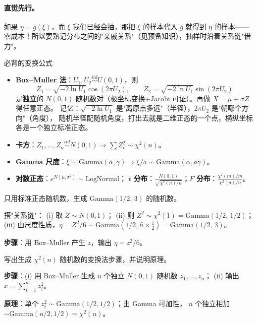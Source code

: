 \paragraph{直觉先行。}
如果 $\eta=g(\xi)$，而 $\xi$ 我们已经会抽，那把 $\xi$ 的样本代入 $g$ 就得到 $\eta$
的样本——零成本！所以要熟记分布之间的"亲戚关系"（见预备知识），抽样时沿着关系链"借力"。

\begin{kbox}{必背的变换公式}
\begin{itemize}[leftmargin=2em]
  \item \textbf{Box--Muller 法}：$U_1,U_2\overset{iid}{\sim}U(0,1)$，则
  \[
  Z_1=\sqrt{-2\ln U_1}\cos(2\pi U_2),\qquad Z_2=\sqrt{-2\ln U_1}\sin(2\pi U_2)
  \]
  是\textbf{独立}的 $N(0,1)$ 随机数对（极坐标变换+Jacobi 可证）。再做 $X=\mu+\sigma Z$ 得任意正态。
  记忆：$\sqrt{-2\ln U_1}$ 是"离原点多远"（半径），$2\pi U_2$ 是"朝哪个方向"（角度），
  随机半径配随机角度，打出去就是二维正态的一个点，横纵坐标各是一个独立标准正态。
  \item \textbf{卡方}：$Z_1,\dots,Z_n\overset{iid}{\sim}N(0,1)\Rightarrow\sum Z_i^2\sim\chi^2(n)$。
  \item \textbf{Gamma 尺度}：$\xi\sim\mathrm{Gamma}(\alpha,\gamma)\Rightarrow\xi/a\sim\mathrm{Gamma}(\alpha,a\gamma)$。
  \item \textbf{对数正态}：$e^{N(\mu,\sigma^2)}\sim\mathrm{LogNormal}$；
  \textbf{$t$ 分布}：$\frac{N(0,1)}{\sqrt{\chi^2(n)/n}}$；\textbf{$F$ 分布}：$\frac{\chi^2(m)/m}{\chi^2(n)/n}$。
\end{itemize}
\end{kbox}

\begin{exbox}
只用标准正态随机数，生成 $\mathrm{Gamma}(1/2,\,3)$ 的随机数。
\end{exbox}
\begin{sol}
搭"关系链"：
(i) 取 $Z\sim N(0,1)$；
(ii) 则 $Z^2\sim\chi^2(1)=\mathrm{Gamma}(1/2,\,1/2)$；
(iii) 由尺度性质，$\eta=Z^2/6\sim\mathrm{Gamma}(1/2,\,6\times\frac12)=\mathrm{Gamma}(1/2,\,3)$。

\textbf{步骤}：用 Box--Muller 产生 $z$，输出 $\eta=z^2/6$。
\end{sol}

\begin{exbox}[生成卡方随机数]
写出生成 $\chi^2(n)$ 随机数的变换法步骤，并说明原理。
\end{exbox}
\begin{sol}
\textbf{步骤}：(i) 用 Box--Muller 生成 $n$ 个独立 $N(0,1)$ 随机数 $z_1,\dots,z_n$；
(ii) 输出 $x=\sum_{i=1}^n z_i^2$。

\textbf{原理}：单个 $z_i^2\sim\mathrm{Gamma}(1/2,1/2)$；由 Gamma 可加性，
$n$ 个独立相加 $\sim\mathrm{Gamma}(n/2,1/2)=\chi^2(n)$。
\end{sol}

